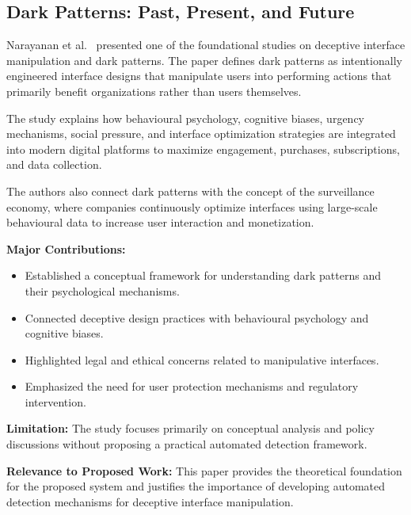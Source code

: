 \subsection{Dark Patterns: Past, Present, and Future}

Narayanan et al.~\cite{narayanan2020} presented one of the foundational studies on deceptive interface manipulation and dark patterns. The paper defines dark patterns as intentionally engineered interface designs that manipulate users into performing actions that primarily benefit organizations rather than users themselves.

The study explains how behavioural psychology, cognitive biases, urgency mechanisms, social pressure, and interface optimization strategies are integrated into modern digital platforms to maximize engagement, purchases, subscriptions, and data collection.

The authors also connect dark patterns with the concept of the surveillance economy, where companies continuously optimize interfaces using large-scale behavioural data to increase user interaction and monetization.

\vspace{0.3cm}

\textbf{Major Contributions:}
\begin{itemize}
\item Established a conceptual framework for understanding dark patterns and their psychological mechanisms.
\item Connected deceptive design practices with behavioural psychology and cognitive biases.
\item Highlighted legal and ethical concerns related to manipulative interfaces.
\item Emphasized the need for user protection mechanisms and regulatory intervention.
\end{itemize}

\vspace{0.3cm}

\textbf{Limitation:}
The study focuses primarily on conceptual analysis and policy discussions without proposing a practical automated detection framework.

\vspace{0.3cm}

\textbf{Relevance to Proposed Work:}
This paper provides the theoretical foundation for the proposed system and justifies the importance of developing automated detection mechanisms for deceptive interface manipulation.

